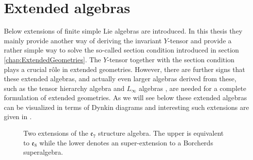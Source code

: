 \section{Extended algebras\label{sec:ExtendedAlgebras}}
Below extensions of finite simple Lie algebras are introduced. In this thesis they mainly provide another way of deriving the invariant $Y$-tensor and provide a rather simple way to solve the so-called section condition introduced in section \ref{chap:ExtendedGeometries}. The $Y$-tensor together with the section condition plays a crucial rôle in extended geometries. However, there are further signs that these extended algebras, and actually even larger algebras derived from these, such as the tensor hierarchy algebra \cite{Palmkvist:2013vya} and $L_\infty$ algebras \cite{Cederwall:2018aab}, are needed for a complete formulation of extended geometries. As we will see below these extended algebras can be visualized in terms of Dynkin diagrams and interesting such extensions are given in .
\begin{figure}
    \centering
    \ExtendedDynkin
    \caption{Two extensions of the $\mathfrak{e}_7$ structure algebra. The upper is equivalent to $\mathfrak{e}_8$ while the lower denotes an super-extension to a Borcherds superalgebra.}
    \label{fig:ExtendedDynk}
\end{figure}

